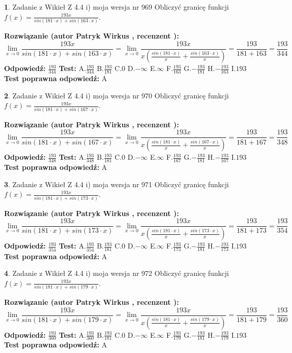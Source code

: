 \documentclass[12pt, a4paper]{article}
\theoremstyle{definition} %
\newtheorem{zad}{}
\newcommand{\zadStart}[1]{\begin{zad}#1\newline}
\newcommand{\zadStop}{\end{zad}}
\newcommand{\rozwStart}[2]{\noindent \textbf{Rozwiązanie (autor #1 , recenzent #2): }\newline}
\newcommand{\rozwStop}{\newline}
\newcommand{\odpStart}{\noindent \textbf{Odpowiedź:}\newline}
\newcommand{\odpStop}{\newline}
\newcommand{\testStart}{\noindent \textbf{Test:}\newline}
\newcommand{\testStop}{\newline}
\newcommand{\kluczStart}{\noindent \textbf{Test poprawna odpowiedź:}\newline}
\newcommand{\kluczStop}{\newline}
\begin{document}
\zadStart{Zadanie z Wikieł Z 4.4 i) moja wersja nr 969}
Obliczyć granicę funkcji $f(x)=\frac{193x}{sin(181\cdot x) +sin(163\cdot x)}$.
\zadStop
\rozwStart{Patryk Wirkus}{}
$$\lim\limits_{x\to 0}\frac{193x}{sin(181\cdot x) +sin(163\cdot x)}=\lim\limits_{x\to 0}\frac{193x}{x(\frac{sin(181\cdot x)}{x}+\frac{sin(163\cdot x)}{x})}=\frac{193}{181+163} = \frac{193}{344}$$
\rozwStop
\odpStart
$\frac{193}{344}$
\odpStop
\testStart
A.$\frac{193}{344}$
B.$\frac{193}{181}$
C.$0$
D.$-\infty$
E.$\infty$
F.$\frac{193}{163}$
G.$-\frac{193}{181}$
H.$-\frac{193}{163}$
I.$193$
\testStop
\kluczStart
A
\kluczStop



\zadStart{Zadanie z Wikieł Z 4.4 i) moja wersja nr 970}
Obliczyć granicę funkcji $f(x)=\frac{193x}{sin(181\cdot x) +sin(167\cdot x)}$.
\zadStop
\rozwStart{Patryk Wirkus}{}
$$\lim\limits_{x\to 0}\frac{193x}{sin(181\cdot x) +sin(167\cdot x)}=\lim\limits_{x\to 0}\frac{193x}{x(\frac{sin(181\cdot x)}{x}+\frac{sin(167\cdot x)}{x})}=\frac{193}{181+167} = \frac{193}{348}$$
\rozwStop
\odpStart
$\frac{193}{348}$
\odpStop
\testStart
A.$\frac{193}{348}$
B.$\frac{193}{181}$
C.$0$
D.$-\infty$
E.$\infty$
F.$\frac{193}{167}$
G.$-\frac{193}{181}$
H.$-\frac{193}{167}$
I.$193$
\testStop
\kluczStart
A
\kluczStop



\zadStart{Zadanie z Wikieł Z 4.4 i) moja wersja nr 971}
Obliczyć granicę funkcji $f(x)=\frac{193x}{sin(181\cdot x) +sin(173\cdot x)}$.
\zadStop
\rozwStart{Patryk Wirkus}{}
$$\lim\limits_{x\to 0}\frac{193x}{sin(181\cdot x) +sin(173\cdot x)}=\lim\limits_{x\to 0}\frac{193x}{x(\frac{sin(181\cdot x)}{x}+\frac{sin(173\cdot x)}{x})}=\frac{193}{181+173} = \frac{193}{354}$$
\rozwStop
\odpStart
$\frac{193}{354}$
\odpStop
\testStart
A.$\frac{193}{354}$
B.$\frac{193}{181}$
C.$0$
D.$-\infty$
E.$\infty$
F.$\frac{193}{173}$
G.$-\frac{193}{181}$
H.$-\frac{193}{173}$
I.$193$
\testStop
\kluczStart
A
\kluczStop



\zadStart{Zadanie z Wikieł Z 4.4 i) moja wersja nr 972}
Obliczyć granicę funkcji $f(x)=\frac{193x}{sin(181\cdot x) +sin(179\cdot x)}$.
\zadStop
\rozwStart{Patryk Wirkus}{}
$$\lim\limits_{x\to 0}\frac{193x}{sin(181\cdot x) +sin(179\cdot x)}=\lim\limits_{x\to 0}\frac{193x}{x(\frac{sin(181\cdot x)}{x}+\frac{sin(179\cdot x)}{x})}=\frac{193}{181+179} = \frac{193}{360}$$
\rozwStop
\odpStart
$\frac{193}{360}$
\odpStop
\testStart
A.$\frac{193}{360}$
B.$\frac{193}{181}$
C.$0$
D.$-\infty$
E.$\infty$
F.$\frac{193}{179}$
G.$-\frac{193}{181}$
H.$-\frac{193}{179}$
I.$193$
\testStop
\kluczStart
A
\kluczStop
\end{document}
